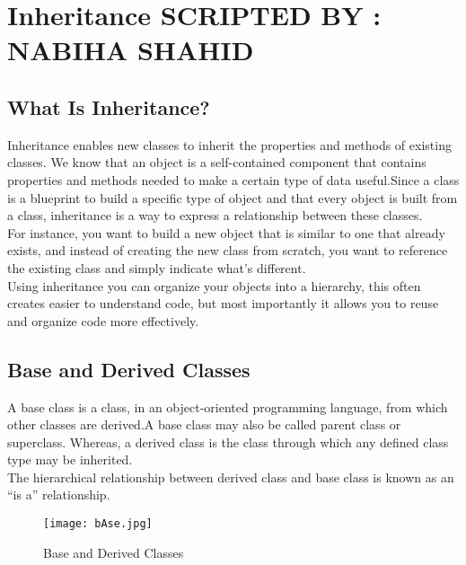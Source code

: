 \documentclass[11pt,fleqn]{book} %
\begin{document}
\newpage


\chapter{Inheritance \hspace{65mm} {\textsc{\small SCRIPTED BY : NABIHA SHAHID}}}

\section{What Is Inheritance?}

Inheritance enables new classes to inherit the properties and methods of existing classes. We know that an object is a self-contained component that contains properties and methods needed to make a certain type of data useful.Since a class is a blueprint to build a specific type of object and that every object is built from a class, inheritance is a way to express a relationship between these classes.\\
For instance, you want to build a new object that is similar to one that already exists, and instead of creating the new class from scratch, you want to reference the existing class and simply indicate what's different.\\
Using inheritance you can organize your objects into a hierarchy, this often creates easier to understand code, but most importantly it allows you to reuse and organize code more effectively.

\section{Base and Derived Classes}

A base class is a class, in an object-oriented programming language, from which other classes are derived.A base class may also be called parent class or superclass. Whereas, a derived class is the class through which any defined class type may be inherited.\\
The hierarchical relationship between derived class and base class is known as an “is a” relationship.
\begin{figure}[h]
  \centering\texttt{[image: bAse.jpg]}
  \caption{Base and Derived Classes}
\end{figure}
\end{document}
